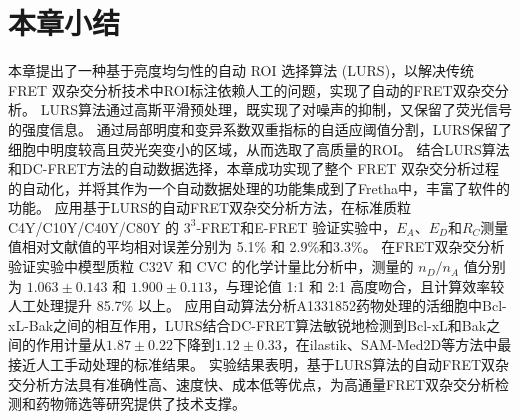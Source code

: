 \section{本章小结}
本章提出了一种基于亮度均匀性的自动 ROI 选择算法 (LURS)，以解决传统 FRET 双杂交分析技术中ROI标注依赖人工的问题，实现了自动的FRET双杂交分析。
LURS算法通过高斯平滑预处理，既实现了对噪声的抑制，又保留了荧光信号的强度信息。
通过局部明度和变异系数双重指标的自适应阈值分割，LURS保留了细胞中明度较高且荧光突变小的区域，从而选取了高质量的ROI。
结合LURS算法和DC-FRET方法的自动数据选择，本章成功实现了整个 FRET 双杂交分析过程的自动化，并将其作为一个自动数据处理的功能集成到了Fretha中，丰富了软件的功能。
应用基于LURS的自动FRET双杂交分析方法，在标准质粒 C4Y/C10Y/C40Y/C80Y 的 $3^3$-FRET和E-FRET 验证实验中，$E_A$、$E_D$和$R_C$测量值相对文献值的平均相对误差分别为 5.1\% 和 2.9\%和3.3\%。
在FRET双杂交分析验证实验中模型质粒 C32V 和 CVC 的化学计量比分析中，测量的 $n_D/n_A$ 值分别为 $1.063 \pm 0.143$ 和 $1.900 \pm 0.113$，与理论值 1:1 和 2:1 高度吻合，且计算效率较人工处理提升 85.7\% 以上。
应用自动算法分析A1331852药物处理的活细胞中Bcl-xL-Bak之间的相互作用，LURS结合DC-FRET算法敏锐地检测到Bcl-xL和Bak之间的作用计量从$1.87 \pm 0.22$下降到$1.12 \pm 0.33$，在ilastik、SAM-Med2D等方法中最接近人工手动处理的标准结果。
实验结果表明，基于LURS算法的自动FRET双杂交分析方法具有准确性高、速度快、成本低等优点，为高通量FRET双杂交分析检测和药物筛选等研究提供了技术支撑。